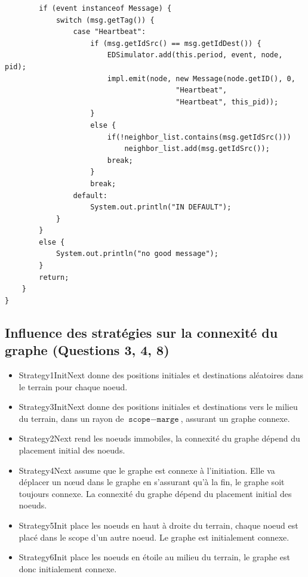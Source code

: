 \documentclass[a4paper]{article}
\begin{document}
\begin{lstlisting}
        if (event instanceof Message) {
            switch (msg.getTag()) {
                case "Heartbeat":
                    if (msg.getIdSrc() == msg.getIdDest()) {
                        EDSimulator.add(this.period, event, node, pid);
                        impl.emit(node, new Message(node.getID(), 0,
                                        "Heartbeat",
                                        "Heartbeat", this_pid));
                    }
                    else {
                        if(!neighbor_list.contains(msg.getIdSrc()))
                            neighbor_list.add(msg.getIdSrc());
                        break;
                    }
                    break;
                default:
                    System.out.println("IN DEFAULT");
            }
        }
        else {
            System.out.println("no good message");
        }
        return;
    }
}
\end{lstlisting}

\subsection{Influence des stratégies sur la connexité du graphe (Questions 3, 4, 8)}

\begin{itemize}
  \item Strategy1InitNext donne des positions initiales et destinations
aléatoires dans le terrain pour chaque noeud.
  \item Strategy3InitNext donne des positions initiales et
    destinations vers le milieu du terrain, dans un rayon de $ \texttt{scope} -
\texttt{marge} $, assurant un graphe
    connexe.
    \item Strategy2Next rend les noeuds immobiles, la connexité du
      graphe dépend du placement initial des noeuds.
  \item Strategy4Next assume que le graphe est connexe à
    l'initiation. Elle va déplacer un nœud dans le graphe en
    s'assurant qu'à la fin, le graphe soit toujours connexe. La
    connexité du graphe dépend du placement initial des noeuds.
    \item Strategy5Init place les noeuds en haut à droite du terrain,
      chaque noeud est placé dans le scope d'un autre noeud.
      Le graphe est initialement connexe.
      \item Strategy6Init place les noeuds en étoile au milieu du
        terrain, le graphe est donc initialement connexe.\\
\end{itemize}
\end{document}
